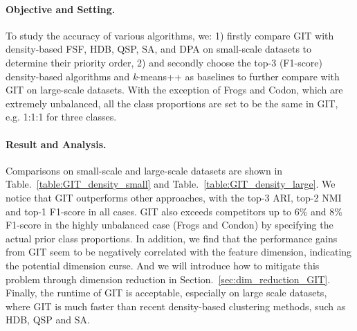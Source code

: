 \documentclass[letterpaper]{article} \usepackage{aaai22}  \usepackage{times}  \usepackage{helvet}  \usepackage{courier}  \usepackage[hyphens]{url}  \usepackage{graphicx} \urlstyle{rm} \def\UrlFont{\rm}  \usepackage{natbib}  \usepackage{caption} \DeclareCaptionStyle{ruled}{labelfont=normalfont,labelsep=colon,strut=off} \frenchspacing  \setlength{\pdfpagewidth}{8.5in}  \setlength{\pdfpageheight}{11in}  \usepackage{subfigure}
\begin{document}
\paragraph{Objective and Setting.} 
To study the accuracy of various algorithms, we: 1) firstly compare GIT with density-based FSF, HDB, QSP, SA, and DPA on small-scale datasets to determine their priority  order, 2) and secondly choose the top-3 (F1-score) density-based algorithms and \textit{k}-means++ as baselines to further compare with GIT on large-scale datasets. With the exception of Frogs and Codon, which are extremely unbalanced, all the class proportions are set to be the same in GIT, e.g. 1:1:1 for three classes.


\paragraph{Result and Analysis.} Comparisons on small-scale and large-scale datasets are shown in Table.~\ref{table:GIT_density_small} and Table.~\ref{table:GIT_density_large}. We notice that GIT outperforms other approaches, with the top-3 ARI, top-2 NMI and top-1 F1-score in all cases. GIT also exceeds competitors up to 6\% and 8\% F1-score in the highly unbalanced case (Frogs and Condon) by specifying the actual prior class proportions. In addition, we find that the performance gains from GIT seem to be negatively correlated with the feature dimension, indicating the potential dimension curse. And we will introduce how to mitigate this problem through dimension reduction in Section.~\ref{sec:dim_reduction_GIT}. Finally, the runtime of GIT is acceptable, especially on large scale datasets, where GIT is much faster than recent density-based clustering methods, such as HDB, QSP and SA.
\end{document}
